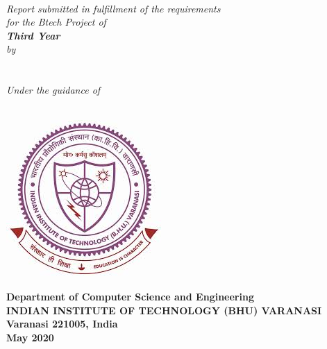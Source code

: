 \begin{titlepage}
\thispagestyle{empty}
\mbox{}
\begin{center}
\textheight 15.5in \textwidth 12.5in {\LARGE\bf  \the\phdtitle}\\[9ex]
\emph{Report submitted in fulfillment of the requirements\\
for the Btech Project of\\
[2ex]\large \bf Third Year
}\\
[2ex] \emph{by} \\[2ex]
{\large\sf \bf \the\name}\\ [7ex] 
            \the\rollno\\[6ex]
\emph{Under the guidance of}\\[1ex]
{\large \sf \bf \the\guide} \\[7ex]

\vspace{.05in}
\begin{center}
 \includegraphics[scale=.7,keepaspectratio=true]{./logo.jpeg}
\end{center}
% 

\vspace{1cm}
{\small  \bf Department of Computer Science and Engineering}  \\[1ex]
{\small \bf{INDIAN INSTITUTE OF TECHNOLOGY (BHU) VARANASI \\
Varanasi 221005, India\\
  May 2020}}

\end{center}
\end{titlepage}
